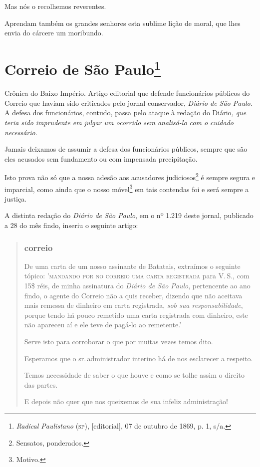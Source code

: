 Mas nós o recolhemos reverentes.

\noindent\dotfill

Aprendam também os grandes senhores esta sublime lição de moral, que
lhes envia do cárcere um moribundo.

\chapter{Correio de São Paulo\footnote{\emph{Radical Paulistano} (\textsc{sp}),
  {[}editorial{]}, 07 de outubro de 1869, p. 1, s/a.}}

\begin{didascalia}
Crônica do Baixo Império. Artigo editorial que defende funcionários
públicos do Correio que haviam sido criticados pelo jornal
conservador,\emph{ Diário de São Paulo}. A defesa dos funcionários,
contudo, passa pelo ataque à redação do Diário\emph{, que teria sido
imprudente em julgar um ocorrido sem analisá-lo com o cuidado
necessário.}
\end{didascalia}



Jamais deixamos de assumir a defesa dos funcionários públicos, sempre
que são eles acusados sem fundamento ou com impensada precipitação.

Isto prova não só que a nossa adesão aos acusadores
judiciosos\footnote{Sensatos, ponderados.} é sempre segura e
imparcial, como ainda que o nosso móvel\footnote{Motivo.} em tais
contendas foi e será sempre a justiça.

A distinta redação do \emph{Diário de São Paulo}, em o nº 1.219 deste
jornal, publicado a 28 do mês findo, inseriu o seguinte artigo:

\begin{quote}
\subsection{correio}

De uma carta de um nosso assinante de Batatais, extraímos o seguinte
tópico: '\textsc{mandando por no correio uma carta registrada} para V.\,S., com
15\$ réis, de minha assinatura do \emph{Diário de São Paulo}, pertencente
ao ano findo, o agente do Correio não a quis receber, dizendo que não
aceitava mais remessa de dinheiro em carta registrada, \emph{sob sua
responsabilidade}, porque tendo há pouco remetido uma carta registrada
com dinheiro, este não apareceu aí e ele teve de pagá-lo ao remetente.'

Serve isto para corroborar o que por muitas vezes temos dito.

Esperamos que o sr.\,administrador interino há de nos esclarecer a
respeito.

Temos necessidade de saber o que houve e como se tolhe assim o direito
das partes.

E depois não quer que nos queixemos de sua infeliz administração!
\end{quote}

